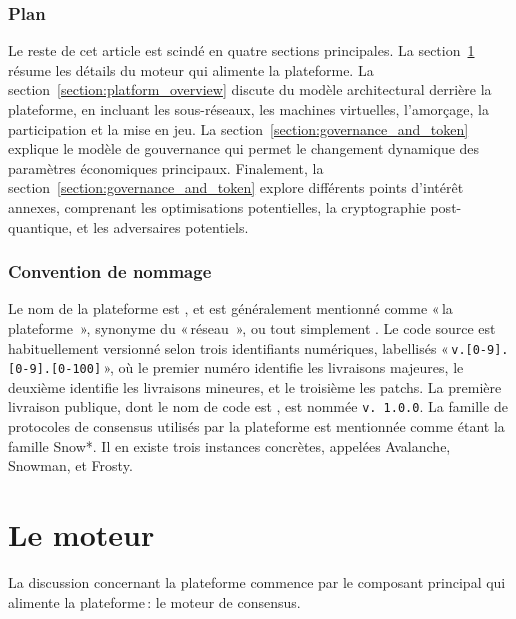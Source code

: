 \documentclass[runningheads,francais,a4paper]{llncs}
\begin{document}
\subsubsection{Plan}
Le reste de cet article est scindé en quatre sections principales. La section~\ref{section:engine} résume les détails du
moteur qui alimente la plateforme. La section~\ref{section:platform_overview} discute du modèle architectural derrière
la plateforme, en incluant les sous-réseaux, les machines virtuelles, l'amorçage, la participation et la mise en jeu.
La section~\ref{section:governance_and_token} explique le modèle de gouvernance qui permet le changement dynamique des
paramètres économiques principaux. Finalement, la section~\ref{section:governance_and_token} explore différents points
d'intérêt annexes, comprenant les optimisations potentielles, la cryptographie post-quantique, et les adversaires
potentiels.

\subsubsection{Convention de nommage}
Le nom de la plateforme est \AVAPlatformName{}, et est généralement mentionné comme
«\,la plateforme \AVAPlatformName{}\,», synonyme du  «\,réseau \AVAPlatformName{}\,», ou tout simplement
\AVAPlatformName{}. Le code source est habituellement versionné selon trois identifiants numériques, labellisés
«\,\texttt{v.[0-9].[0-9].[0-100]}\,», où le premier numéro identifie les livraisons majeures, le deuxième identifie les
livraisons mineures, et le troisième les patchs. La première livraison publique, dont le nom de code est
\AVAPlatformNameFirstRelease{}, est nommée \texttt{v. 1.0.0}. La famille de protocoles de consensus utilisés par la
plateforme \AVAPlatformName{} est mentionnée comme étant la famille Snow*. Il en existe trois instances concrètes,
appelées Avalanche, Snowman, et Frosty.

\section{Le moteur}
\label{section:engine}
La discussion concernant la plateforme \AVAPlatformName{} commence par le composant principal qui alimente la
plateforme\,: le moteur de consensus.
\end{document}
